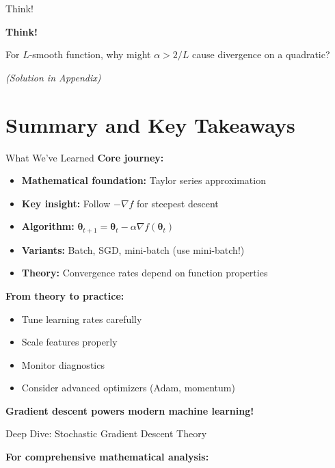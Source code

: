 \documentclass[aspectratio=169,11pt]{beamer}
\newcommand{\grad}{\nabla}
\newcommand{\vtheta}{\bm{\theta}}
\begin{document}
\begin{frame}{Think!}
\begin{center}
\Large \textbf{Think!}
\end{center}

For $L$-smooth function, why might $\alpha > 2/L$ cause divergence on a quadratic?

\pause
\vspace{1cm}
\textit{(Solution in Appendix)}
\end{frame}

\section{Summary and Key Takeaways}

\begin{frame}{What We've Learned}
\textbf{Core journey:}
\begin{itemize}
\item \textbf{Mathematical foundation:} Taylor series approximation
\item \textbf{Key insight:} Follow $-\grad f$ for steepest descent
\item \textbf{Algorithm:} $\vtheta_{t+1} = \vtheta_t - \alpha \grad f(\vtheta_t)$
\item \textbf{Variants:} Batch, SGD, mini-batch (use mini-batch!)
\item \textbf{Theory:} Convergence rates depend on function properties
\end{itemize}

\pause
\textbf{From theory to practice:}
\begin{itemize}
\item Tune learning rates carefully
\item Scale features properly
\item Monitor diagnostics
\item Consider advanced optimizers (Adam, momentum)
\end{itemize}

\pause
\begin{center}
\alert{\textbf{Gradient descent powers modern machine learning!}}
\end{center}
\end{frame}

\begin{frame}{Deep Dive: Stochastic Gradient Descent Theory}
\begin{center}
\textbf{For comprehensive mathematical analysis:}
\end{center}
\end{frame}
\end{document}
